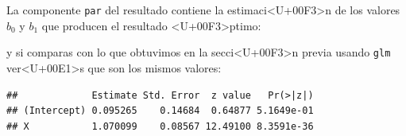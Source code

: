 \documentclass[10pt,a4paper]{article}
\newcounter {cont01}
\begin{document}
La componente {\tt par} del resultado contiene la estimaci<U+00F3>n de los valores $b_0$ y $b_1$ que producen el resultado <U+00F3>ptimo:
\begin{knitrout}
\color{fgcolor}\begin{kframe}
\begin{alltt}
\hlopt{$}
\end{alltt}


{\ttfamily\noindent\bfseries\color{errorcolor}{\#\# Error in eval(expr, envir, enclos): objeto 'optimizacion' no encontrado}}\end{kframe}
\end{knitrout}
y si comparas con lo que obtuvimos en la secci<U+00F3>n previa usando {\tt glm} ver<U+00E1>s que son los mismos valores:
\begin{knitrout}
\color{fgcolor}\begin{kframe}
\begin{alltt}
\hlopt{$}
\end{alltt}
\begin{verbatim}
##             Estimate Std. Error  z value   Pr(>|z|)
## (Intercept) 0.095265    0.14684  0.64877 5.1649e-01
## X           1.070099    0.08567 12.49100 8.3591e-36
\end{verbatim}
\end{kframe}
\end{knitrout}
\end{document}
